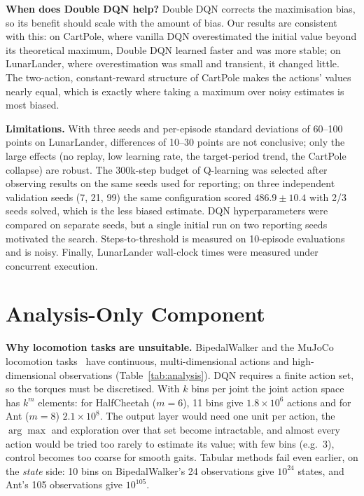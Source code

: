 \documentclass[10pt,twocolumn,letterpaper]{article}
\begin{document}
\textbf{When does Double DQN help?} Double DQN corrects the maximisation bias, so its benefit should scale with the amount of bias. Our results are consistent with this: on CartPole, where vanilla DQN overestimated the initial value beyond its theoretical maximum, Double DQN learned faster and was more stable; on LunarLander, where overestimation was small and transient, it changed little. The two-action, constant-reward structure of CartPole makes the actions' values nearly equal, which is exactly where taking a maximum over noisy estimates is most biased.

\textbf{Limitations.} With three seeds and per-episode standard deviations of 60--100 points on LunarLander, differences of 10--30 points are not conclusive; only the large effects (no replay, low learning rate, the target-period trend, the CartPole collapse) are robust. The 300k-step budget of Q-learning was selected after observing results on the same seeds used for reporting; on three independent validation seeds (7, 21, 99) the same configuration scored $486.9\pm10.4$ with 2/3 seeds solved, which is the less biased estimate. DQN hyperparameters were compared on separate seeds, but a single initial run on two reporting seeds motivated the search. Steps-to-threshold is measured on 10-episode evaluations and is noisy. Finally, LunarLander wall-clock times were measured under concurrent execution.

\section{Analysis-Only Component}

\textbf{Why locomotion tasks are unsuitable.} BipedalWalker and the MuJoCo locomotion tasks~\cite{todorov2012} have continuous, multi-dimensional actions and high-dimensional observations (Table~\ref{tab:analysis}). DQN requires a finite action set, so the torques must be discretised. With $k$ bins per joint the joint action space has $k^{m}$ elements: for HalfCheetah ($m=6$), 11 bins give $1.8\times10^6$ actions and for Ant ($m=8$) $2.1\times10^8$. The output layer would need one unit per action, the $\arg\max$ and exploration over that set become intractable, and almost every action would be tried too rarely to estimate its value; with few bins (e.g.\ 3), control becomes too coarse for smooth gaits. Tabular methods fail even earlier, on the \emph{state} side: 10 bins on BipedalWalker's 24 observations give $10^{24}$ states, and Ant's 105 observations give $10^{105}$.
\end{document}
